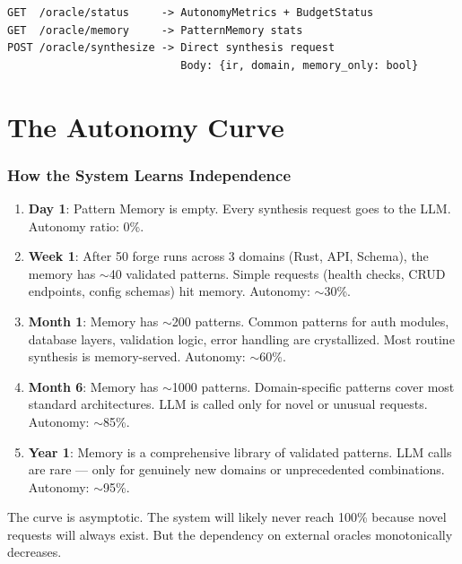\documentclass[11pt,a4paper,twoside]{article}
\theoremstyle{definition}
\theoremstyle{plain}
\theoremstyle{remark}
\begin{document}
\begin{lstlisting}[title={New Gateway Endpoints}]
GET  /oracle/status     -> AutonomyMetrics + BudgetStatus
GET  /oracle/memory     -> PatternMemory stats
POST /oracle/synthesize -> Direct synthesis request
                           Body: {ir, domain, memory_only: bool}
\end{lstlisting}


\part{The Autonomy Curve}\label{part:curve}

\section{How the System Learns Independence}\label{sec:independence}

\begin{enumerate}[nosep]
  \item \textbf{Day 1}: Pattern Memory is empty. Every synthesis
        request goes to the LLM. Autonomy ratio: 0\%.
  \item \textbf{Week 1}: After 50 forge runs across 3 domains (Rust,
        API, Schema), the memory has $\sim$40 validated patterns.
        Simple requests (health checks, CRUD endpoints, config schemas)
        hit memory. Autonomy: $\sim$30\%.
  \item \textbf{Month 1}: Memory has $\sim$200 patterns. Common patterns
        for auth modules, database layers, validation logic, error
        handling are crystallized. Most routine synthesis is memory-served.
        Autonomy: $\sim$60\%.
  \item \textbf{Month 6}: Memory has $\sim$1000 patterns. Domain-specific
        patterns cover most standard architectures. LLM is called only
        for novel or unusual requests. Autonomy: $\sim$85\%.
  \item \textbf{Year 1}: Memory is a comprehensive library of validated
        patterns. LLM calls are rare --- only for genuinely new
        domains or unprecedented combinations. Autonomy: $\sim$95\%.
\end{enumerate}

The curve is asymptotic. The system will likely never reach 100\%
because novel requests will always exist. But the dependency on
external oracles monotonically decreases.
\end{document}
